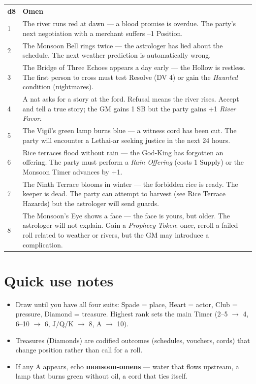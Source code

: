 \begin{longtable}{|p{1.5cm}|p{10cm}|}
\hline
\rowcolor{gray!20}
\textbf{d8} & \textbf{Omen} \\
\hline
1 & The river runs red at dawn --- a blood promise is overdue. The party's next negotiation with a merchant suffers --1 Position. \\
\hline
2 & The Monsoon Bell rings twice --- the astrologer has lied about the schedule. The next weather prediction is automatically wrong. \\
\hline
3 & The Bridge of Three Echoes appears a day early --- the Hollow is restless. The first person to cross must test Resolve (DV 4) or gain the \textit{Haunted} condition (nightmares). \\
\hline
4 & A nat asks for a story at the ford. Refusal means the river rises. Accept and tell a true story; the GM gains 1 SB but the party gains +1 \textit{River Favor}. \\
\hline
5 & The Vigil's green lamp burns blue --- a witness cord has been cut. The party will encounter a Lethai-ar seeking justice in the next 24 hours. \\
\hline
6 & Rice terraces flood without rain --- the God-King has forgotten an offering. The party must perform a \textit{Rain Offering} (costs 1 Supply) or the Monsoon Timer advances by +1. \\
\hline
7 & The Ninth Terrace blooms in winter --- the forbidden rice is ready. The keeper is dead. The party can attempt to harvest (see Rice Terrace Hazards) but the astrologer will send guards. \\
\hline
8 & The Monsoon's Eye shows a face --- the face is yours, but older. The astrologer will not explain. Gain a \textit{Prophecy Token}: once, reroll a failed roll related to weather or rivers, but the GM may introduce a complication. \\
\hline
\end{longtable}

\section*{Quick use notes}
\label{sec:ayokha-quick-use}
\begin{itemize}
\item Draw until you have all four suits: Spade = place, Heart = actor, Club = pressure, Diamond = treasure. Highest rank sets the main Timer (2--5 $\rightarrow$ 4, 6--10 $\rightarrow$ 6, J/Q/K $\rightarrow$ 8, A $\rightarrow$ 10).
\item Treasures (Diamonds) are codified outcomes (schedules, vouchers, cords) that change position rather than call for a roll.
\item If any A appears, echo \textbf{monsoon-omens} --- water that flows upstream, a lamp that burns green without oil, a cord that ties itself.
\end{itemize}

